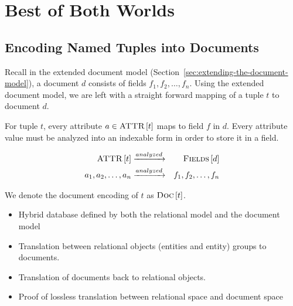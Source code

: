\chapter{Best of Both Worlds}
    \section{Encoding Named Tuples into Documents}
        Recall in the extended document model (Section~\ref{sec:extending-the-document-model}), a document $d$ consists of fields $f_1, f_2, \dotsc, f_n$.  Using the extended document model, we are left with a straight forward mapping of a tuple $t$ to document $d$.
        
        For tuple $t$, every attribute $a \in \textsc{ATTR}\left[t\right]$ maps to field $f$ in $d$.  Every attribute value must be analyzed into an indexable form in order to store it in a field.
        
        \begin{eqnarray*}
            \textsc{ATTR}\left[t\right] &\xrightarrow{analyzed}& \textsc{Fields}\left[d\right] \\
            a_1, a_2, \dotsc, a_n &\xrightarrow{analyzed}& f_1, f_2, \dotsc, f_n
        \end{eqnarray*}
        
        We denote the document encoding of $t$ as $\textsc{Doc}\left[t\right]$.

\begin{itemize}
	\item Hybrid database defined by both the relational model and the document model
	\item Translation between relational objects (entities and entity) groups to documents.
	\item Translation of documents back to relational objects.
	\item Proof of lossless translation between relational space and document space
\end{itemize}